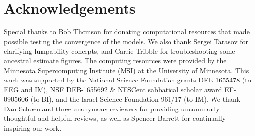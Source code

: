 \documentclass[11pt]{article}
\begin{document}
\section{Acknowledgements}
Special thanks to Bob Thomson for donating computational resources that made possible testing the convergence of the models. 
We also thank Sergei Tarasov for clarifying lumpability concepts, and Carrie Tribble for troubleshooting some ancestral estimate figures. 
The computing resources were provided by the Minnesota Supercomputing Institute (MSI) at the University of Minnesota.
This work was supported by the National Science Foundation grants DEB-1655478 (to EEG and IM), NSF DEB-1655692 \& NESCent sabbatical scholar award EF-0905606 (to BI), and the Israel Science Foundation 961/17 (to IM). %
We thank Dan Schoen and three anonymous reviewers for providing uncommonly thoughtful and helpful reviews, as well as Spencer Barrett for continually inspiring our work.



\clearpage



\setstretch{\stretchby}
\end{document}
